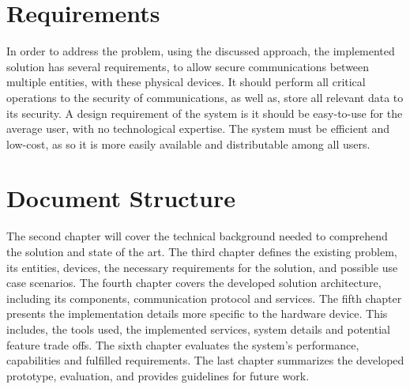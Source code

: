 \section{Requirements}\label{chap:intro:requirements}

In order to address the problem, using the discussed approach, the implemented solution has several requirements, to allow secure communications between multiple entities, with these physical devices.
It should perform all critical operations to the security of communications, as well as, store all relevant data to its security.
A design requirement of the system is it should be easy-to-use for the average user, with no technological expertise. The system must be efficient and low-cost, as so it is more easily available and distributable among all users.

\section{Document Structure}\label{chap:intro:doc}

The second chapter will cover the technical background needed to comprehend the solution and state of the art.
The third chapter defines the existing problem, its entities, devices, the necessary requirements for the solution, and possible use case scenarios.
The fourth chapter covers the developed solution architecture, including its components, communication protocol and services.
The fifth chapter presents the implementation details more specific to the hardware device. This includes, the tools used, the implemented services, system details and potential feature trade offs. The sixth chapter evaluates the system's performance, capabilities and fulfilled requirements. The last chapter summarizes the developed prototype, evaluation, and provides guidelines for future work.
